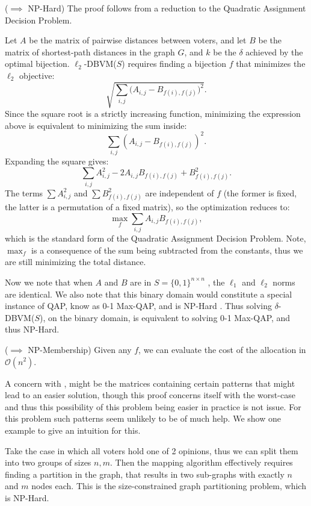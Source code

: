 \begin{proofc}{}
	($\implies$ NP-Hard) The proof follows from a reduction to the Quadratic Assignment Decision Problem.

	Let $A$ be the matrix of pairwise distances between voters, and let $B$ be the matrix of shortest-path distances in the graph $G$, and $k$ be the $\delta$ achieved by the optimal bijection. $\ell_2$-DBVM($S$) requires finding a bijection $f$ that minimizes the $\ell_2$ objective:
	$$
		\sqrt{\sum_{i,j} \bigl(A_{i,j} - B_{f(i),f(j)}\bigr)^2}.
	$$
	Since the square root is a strictly increasing function, minimizing the expression above is equivalent to minimizing the sum inside:
	$$
		\sum_{i,j} (A_{i,j} - B_{f(i),f(j)})^2.
	$$
	Expanding the square gives:
	$$
		\sum_{i,j} A_{i,j}^2 - 2 A_{i,j} B_{f(i),f(j)} + B_{f(i),f(j)}^2.
	$$
	The terms $\sum A_{i,j}^2$ and $\sum B_{f(i),f(j)}^2$ are independent of $f$ (the former is fixed, the latter is a permutation of a fixed matrix), so the optimization reduces to:
	$$
		\max_f \sum_{i,j} A_{i,j} B_{f(i),f(j)},
	$$
	which is the standard form of the Quadratic Assignment Decision Problem. Note, $\max_f$ is a consequence of the sum being subtracted from the constants, thus we are still minimizing the total distance.

	Now we note that when $A$ and $B$ are in $S= \{0,1\}^{n \times n}$ , the
	$\ell_1$ and $\ell_2$ norms are identical. We also note that this binary
	domain would constitute a special instance of QAP, know as 0-1 Max-QAP, and
	is NP-Hard \cite{nagarajanMaximumQuadraticAssignment}. Thus solving
	$\delta$-DBVM($S$), on the binary domain, is equivalent to solving 0-1
	Max-QAP, and thus NP-Hard.~\checkmark


	($\implies$ NP-Membership) Given any $f$, we can evaluate the cost of the allocation in $\mathcal{O}(n^2)$.~\checkmark


\end{proofc}

A concern with , might be the matrices
containing certain patterns that might lead to an easier solution, though this
proof concerns itself with the worst-case and thus this possibility of this
problem being easier in practice is not issue. For this problem such patterns
seem unlikely to be of much help. We show one example to give an intuition for
this.

Take the case in which all voters hold one of 2 opinions, thus we can split
them into two groups of sizes $n, m$. Then the mapping algorithm
effectively requires finding a partition in the graph, that results in two
sub-graphs with exactly $n$ and $m$ nodes each. This is the
size-constrained graph partitioning problem, which is NP-Hard.

